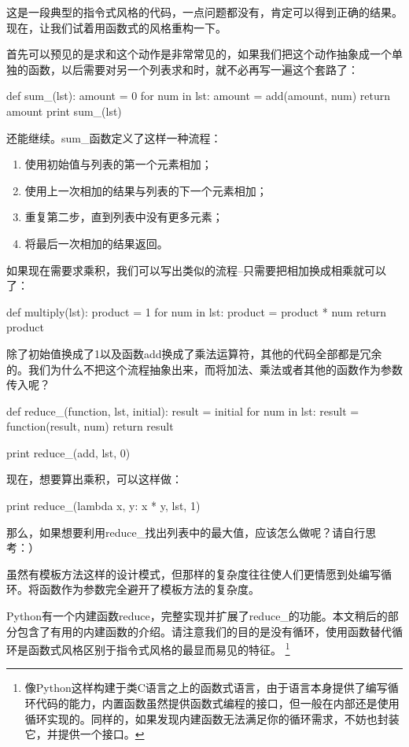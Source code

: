\documentclass[12pt,a4paper]{report}
\begin{document}
这是一段典型的指令式风格的代码，一点问题都没有，肯定可以得到正确的结果。现在，让我们试着用函数式的风格重构一下。

首先可以预见的是求和这个动作是非常常见的，如果我们把这个动作抽象成一个单独的函数，以后需要对另一个列表求和时，就不必再写一遍这个套路了： 
\begin{python}[moreemph={[4]42},caption={},label=ex1]
def sum_(lst):
    amount = 0
    for num in lst:
        amount = add(amount, num)
        return amount 
    print sum_(lst)
\end{python}

还能继续。sum\_函数定义了这样一种流程： 
\begin{enumerate}
    \item 使用初始值与列表的第一个元素相加；
    \item 使用上一次相加的结果与列表的下一个元素相加；
    \item 重复第二步，直到列表中没有更多元素；
    \item 将最后一次相加的结果返回。
\end{enumerate}

如果现在需要求乘积，我们可以写出类似的流程--只需要把相加换成相乘就可以了： 
\begin{python}[moreemph={[4]42},caption={},label=ex1]
def multiply(lst):
    product = 1
    for num in lst:
        product = product * num
    return product
\end{python}

除了初始值换成了1以及函数add换成了乘法运算符，其他的代码全部都是冗余的。我们为什么不把这个流程抽象出来，而将加法、乘法或者其他的函数作为参数传入呢？ 
\begin{python}[moreemph={[4]42},caption={},label=ex1]
def reduce_(function, lst, initial):
    result = initial
    for num in lst:
    result = function(result, num)
    return result
     
print reduce_(add, lst, 0)
\end{python}

现在，想要算出乘积，可以这样做：
\begin{python}[moreemph={[4]42},caption={},label=ex1]
print reduce_(lambda x, y: x * y, lst, 1)
\end{python}

那么，如果想要利用reduce\_找出列表中的最大值，应该怎么做呢？请自行思考：）

虽然有模板方法这样的设计模式，但那样的复杂度往往使人们更情愿到处编写循环。将函数作为参数完全避开了模板方法的复杂度。

Python有一个内建函数reduce，完整实现并扩展了reduce\_的功能。本文稍后的部分包含了有用的内建函数的介绍。请注意我们的目的是没有循环，使用函数替代循环是函数式风格区别于指令式风格的最显而易见的特征。
\footnote{像Python这样构建于类C语言之上的函数式语言，由于语言本身提供了编写循环代码的能力，内置函数虽然提供函数式编程的接口，但一般在内部还是使用循环实现的。同样的，如果发现内建函数无法满足你的循环需求，不妨也封装它，并提供一个接口。}
\end{document}
